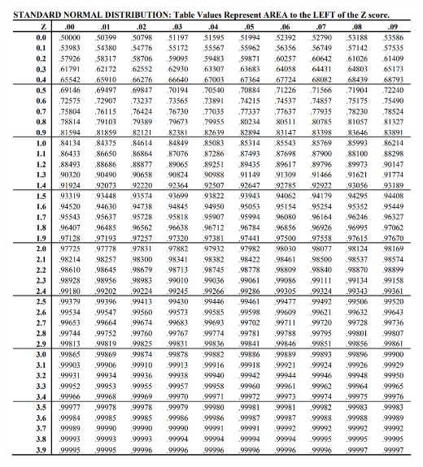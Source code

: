 \documentclass[9pt]{article}
\begin{document}
\begin{multicols*}{2}
        \includegraphics*{images/NormalTable.png}
    \end{multicols*}
\end{document}
